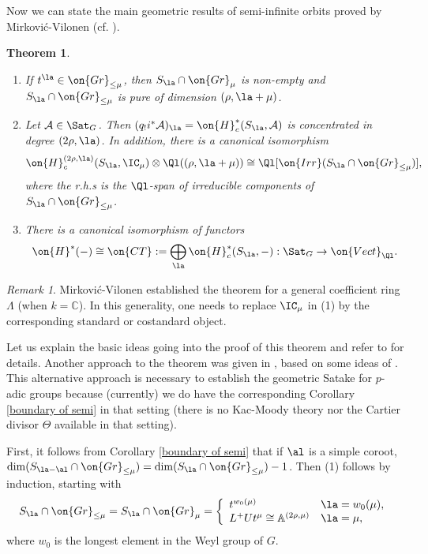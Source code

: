 \documentclass[]{pcmi}
\theoremstyle{plain}
\newtheorem{thm}[equation]{Theorem}
\theoremstyle{remark}
\newtheorem{rmk}[equation]{Remark}
\theoremstyle{definition}
\newcommand{\bA}{{\mathbb A}}
\newcommand{\bC}{{\mathbb C}}
\newcommand{\mA}{{\mathcal A}}
\newcommand{\Gr}{{\on{Gr}}}
\begin{document}
Now we can state the main geometric results of semi-infinite orbits proved by Mirkovi\'c-Vilonen (cf. \cite[\S\ 3]{MV}). 
\begin{thm}\label{MV theory}~
\begin{enumerate}
\item If $t^\la\in \Gr_{\leq \mu}$, then $S_\la\cap \Gr_\mu$ is non-empty and $S_\la \cap \Gr_{\leq \mu}$ is
pure of dimension $(\rho,\la+\mu)$.

\item Let $\mA\in\Sat_G$. Then $(q_!i^*\mA)_\la=\on{H}_c^*(S_\la, \mA)$ is concentrated in degree $(2\rho,\la)$. In addition, there is a canonical isomorphism
$$\on{H}_c^{(2\rho,\la)}(S_\la, \IC_\mu)\otimes\Ql((\rho,\la+\mu))\cong \Ql[\on{Irr}(S_\la\cap\Gr_{\leq \mu})],$$ where the r.h.s is the $\Ql$-span of irreducible components of $S_\la\cap\Gr_{\leq \mu}$.

\item There is a canonical isomorphism of functors
$$\on{H}^*(-)\cong \on{CT}:=\bigoplus_\la \on{H}_c^*(S_\la,-):\Sat_G\to \on{Vect}_{\Ql}.$$
\end{enumerate}
\end{thm}
\begin{rmk}
Mirkovi\'c-Vilonen established the theorem for a general coefficient ring $\Lambda$ (when $k=\bC$). In this generality, one needs to replace $\IC_\mu$ in (1) by the corresponding standard or costandard object.
\end{rmk}

Let us explain the basic ideas going into the proof of this theorem and refer to \cite[\S\ 3]{MV} for details.  Another approach to the theorem was given in \cite[\S~2.2]{Z14}, based on some ideas of \cite{NP}. This alternative approach is necessary to establish the geometric Satake for $p$-adic groups because (currently) we do have the corresponding Corollary \ref{boundary of semi} in that setting (there is no Kac-Moody theory nor the Cartier divisor $\Theta$ available in that setting). 

First, it follows from Corollary \ref{boundary of semi} that if $\al$ is a simple coroot, $\dim(S_{\la-\al}\cap\Gr_{\leq \mu})=\dim(S_\la\cap\Gr_{\leq \mu})-1$. Then  (1) follows by induction, starting with
\begin{equation}\label{extreme semi}
S_\la\cap \Gr_{\leq \mu}=S_\la\cap \Gr_\mu=\left\{\begin{array}{ll}t^{w_0(\mu)} & \la=w_0(\mu), \\
                               L^+U t^\mu\cong \bA^{(2\rho,\mu)} & \la=\mu, \end{array}\right.
\end{equation}
where $w_0$ is the longest element in the Weyl group of $G$.
\end{document}
